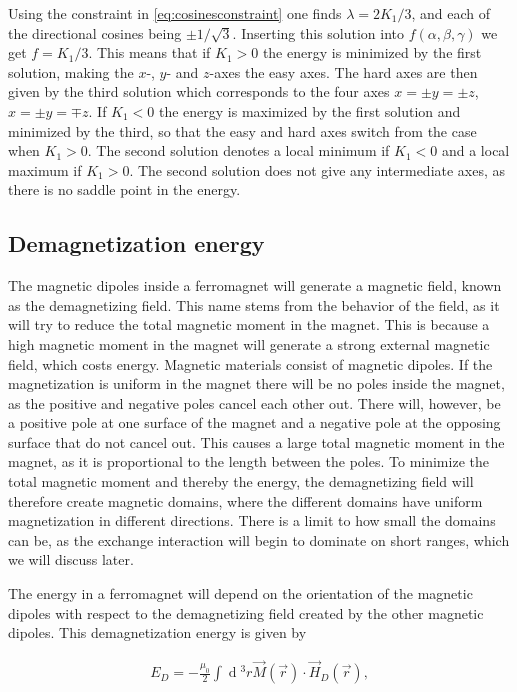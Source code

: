 \documentclass[1p]{elsarticle}		%
\renewcommand{\d}[1]{\ensuremath{\operatorname{d}\!{#1}}}
\begin{document}
Using the constraint in \eqref{eq:cosinesconstraint} one finds $\lambda = 2K_1/3$, and each of the directional cosines being $\pm 1/\sqrt{3}$. Inserting this solution into $f(\alpha, \beta, \gamma)$ we get $f = K_1/3$. This means that if $K_1 > 0$ the energy is minimized by the first solution, making the $x$-, $y$- and $z$-axes the easy axes. The hard axes are then given by the third solution which corresponds to the four axes $x = \pm y = \pm z$, $x = \pm y = \mp z$. If $K_1 < 0$ the energy is maximized by the first solution and minimized by the third, so that the easy and hard axes switch from the case when $K_1 > 0$. The second solution denotes a local minimum if $K_1<0$ and a local maximum if $K_1>0$. The second solution does not give any intermediate axes, as there is no saddle point in the energy.


\subsection{Demagnetization energy}
The magnetic dipoles inside a ferromagnet will generate a magnetic field, known as the demagnetizing field. This name stems from the behavior of the field, as it will try to reduce the total magnetic moment in the magnet. This is because a high magnetic moment in the magnet will generate a strong external magnetic field, which costs energy. Magnetic materials consist of magnetic dipoles. If the magnetization is uniform in the magnet there will be no poles inside the magnet, as the positive and negative poles cancel each other out. There will, however, be a positive pole at one surface of the magnet and a negative pole at the opposing surface that do not cancel out. This causes a large total magnetic moment in the magnet, as it is proportional to the length between the poles. To minimize the total magnetic moment and thereby the energy, the demagnetizing field will therefore create magnetic domains, where the different domains have uniform magnetization in different directions. There is a limit to how small the domains can be, as the exchange interaction will begin to dominate on short ranges, which we will discuss later. 

The energy in a ferromagnet will depend on the orientation of the magnetic dipoles with respect to the demagnetizing field created by the other magnetic dipoles. This demagnetization energy is given by

\begin{align}
\label{eq:demagenergy}
E_D = -\frac{\mu_0}{2}\int \d {^3}r \vec{M}(\vec{r})\cdot\vec{H}_D(\vec{r}),
\end{align}
\end{document}
